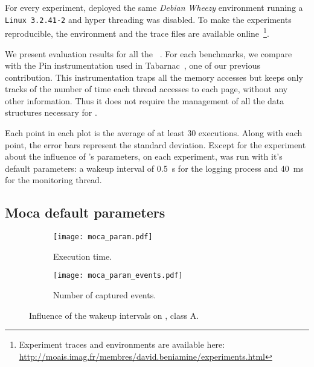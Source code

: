 For every experiment, deployed the same \emph{Debian} \emph{Wheezy}
environment running a \texttt{Linux 3.2.41-2} and hyper threading was
disabled.
To make the experiments reproducible, the environment and the trace files are
available
online~\footnote{Experiment traces and environments are available here:\\ \url{http://moais.imag.fr/membres/david.beniamine/experiments.html}}.

We present evaluation results for all the \NPB~\cite{Jin1999}. For
each benchmarks, we compare \Moca with the Pin instrumentation
used in Tabarnac~\cite{Beniamine15TABARNACRR}, one of our previous contribution. This instrumentation traps all the
memory accesses but keeps only tracks of the number of time each thread accesses to
each page, without any other information. Thus it does not require the management
of all the data structures necessary for \Moca.

Each point in each plot is the average of at least $30$ executions. Along with each point,
the error bars represent the standard deviation.
Except for the experiment about the influence of \Moca's parameters, on each
experiment, \Moca was run with it's default parameters: a wakeup interval of
\SI{0.5}{s} for the logging process and \SI{40}{ms} for the monitoring thread.

\subsection{Moca default parameters}
\label{sec:expe-param}

\begin{figure}[htb]
    \centering
    \begin{subfigure}{\linewidth}
        \texttt{[image: moca\_param.pdf]}
        \caption{Execution time.}
        \label{fig:param_time}
    \end{subfigure}

    \begin{subfigure}{\linewidth}
        \texttt{[image: moca\_param\_events.pdf]}
        \caption{Number of captured events.}
        \label{fig:param_evts}
    \end{subfigure}
    \caption{Influence of the wakeup intervals on \IS, class A.}
    \label{fig:param}
\end{figure}




